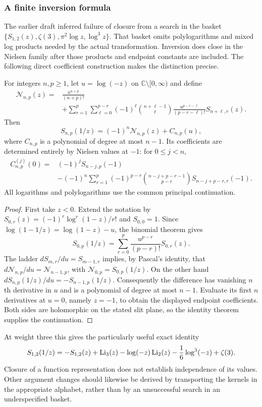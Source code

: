 \subsubsection*{A finite inversion formula}
The earlier draft inferred failure of closure from a search in the basket
$\{S_{1,2}(z),\zeta(3),\pi^2\log z,\log^3z\}$. That basket omits
polylogarithms and mixed log products needed by the actual transformation.
Inversion does close in the Nielsen family after those products and endpoint
constants are included. The following direct coefficient construction makes
the distinction precise.

\begin{proposition}
For integers $n,p\ge1$, let $u=\log(-z)$ on
$\mathbb C\setminus[0,\infty)$ and define
\begin{align*}
\mathcal N_{n,p}(z)={}&\frac{u^{n+p}}{(n+p)!}\\
&+\sum_{r=1}^p\sum_{\ell=0}^{p-r}(-1)^\ell
 \binom{n+\ell-1}{\ell}
 \frac{u^{p-r-\ell}}{(p-r-\ell)!}S_{n+\ell,r}(z).
\end{align*}
Then
\[
S_{n,p}(1/z)=(-1)^n\mathcal N_{n,p}(z)+C_{n,p}(u),
\]
where $C_{n,p}$ is a polynomial of degree at most $n-1$. Its coefficients
are determined entirely by Nielsen values at $-1$: for $0\le j<n$,
\begin{align*}
C_{n,p}^{(j)}(0)={}&(-1)^j S_{n-j,p}(-1)\\
&-(-1)^n\sum_{r=1}^p(-1)^{p-r}
 \binom{n-j+p-r-1}{p-r}S_{n-j+p-r,r}(-1).
\end{align*}
All logarithms and polylogarithms use the common principal continuation.
\end{proposition}
\begin{proof}
First take $z<0$. Extend the notation by
$S_{0,r}(z)=(-1)^r\log^r(1-z)/r!$ and $S_{0,0}=1$.
Since $\log(1-1/z)=\log(1-z)-u$, the binomial theorem gives
\[
S_{0,p}(1/z)=\sum_{r=0}^p\frac{u^{p-r}}{(p-r)!}S_{0,r}(z).
\]
The ladder $dS_{m,r}/du=S_{m-1,r}$ implies, by Pascal's identity,
that $d\mathcal N_{n,p}/du=\mathcal N_{n-1,p}$, with
$\mathcal N_{0,p}=S_{0,p}(1/z)$. On the other hand
$dS_{n,p}(1/z)/du=-S_{n-1,p}(1/z)$.
Consequently the difference has vanishing $n$th derivative in $u$
and is a polynomial of degree at most $n-1$. Evaluate its first
$n$ derivatives at $u=0$, namely $z=-1$, to obtain the displayed
endpoint coefficients. Both sides are holomorphic on the stated slit
plane, so the identity theorem supplies the continuation.
\end{proof}
At weight three this gives the particularly useful exact identity
\[
S_{1,2}(1/z)=-S_{1,2}(z)+\operatorname{Li}_3(z)-\log(-z)\operatorname{Li}_2(z)
-\frac16\log^3(-z)+\zeta(3).
\]
Closure of a function representation does not establish independence of
its values. Other argument changes should likewise be derived by transporting
the kernels in the appropriate alphabet, rather than by an unsuccessful
search in an underspecified basket.
